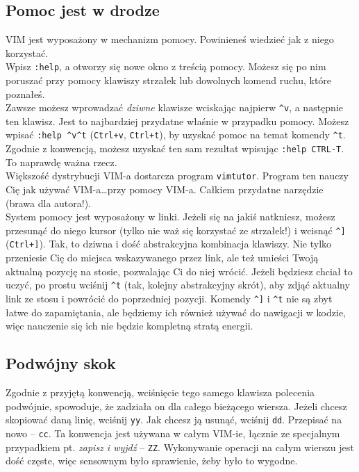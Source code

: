 \documentclass[a4paper,12pt]{article}
\begin{document}
\subsection{Pomoc jest w drodze}
VIM jest wyposażony w mechanizm pomocy. Powinieneś wiedzieć jak z niego korzystać.\\
Wpisz {\tt :help}, a otworzy się nowe okno z treścią pomocy. Możesz się po nim poruszać przy pomocy klawiszy strzałek lub dowolnych komend ruchu, które poznałeś.\\
Zawsze możesz wprowadzać {\it dziwne} klawisze wciskając najpierw {\tt \^{}v}, a następnie ten klawisz. Jest to najbardziej przydatne właśnie w przypadku pomocy. Możesz wpisać {\tt :help \^{}v\^{}t} ({\tt Ctrl+v}, {\tt Ctrl+t}), by uzyskać pomoc na temat komendy {\tt \^{}t}. Zgodnie z konwencją, możesz uzyskać ten sam rezultat wpisując {\tt :help CTRL-T}. To naprawdę ważna rzecz.\\
Większość dystrybucji VIM-a dostarcza program {\tt vimtutor}. Program ten nauczy Cię jak używać VIM-a\ldots przy pomocy VIM-a. Całkiem przydatne narzędzie (brawa dla autora!).\\
System pomocy jest wyposażony w linki. Jeżeli się na jakiś natkniesz, możesz przesunąć do niego kursor (tylko nie waż się korzystać ze strzałek!) i wcisnąć {\tt \^{}]} ({\tt Ctrl+]}). Tak, to dziwna i dość abstrakcyjna kombinacja klawiszy. Nie tylko przeniesie Cię do miejsca wskazywanego przez link, ale też umieści Twoją aktualną pozycję na stosie, pozwalając Ci do niej wrócić. Jeżeli będziesz chciał to uczyć, po prostu wciśnij {\tt \^{}t} (tak, kolejny abstrakcyjny skrót), aby zdjąć aktualny link ze stosu i powrócić do poprzedniej pozycji. Komendy {\tt \^{}]} i {\tt \^{}t} nie są zbyt łatwe do zapamiętania, ale będziemy ich również używać do nawigacji w kodzie, więc nauczenie się ich nie będzie kompletną stratą energii.
\subsection{Podwójny skok}
Zgodnie z przyjętą konwencją, wciśnięcie tego samego klawisza polecenia podwójnie, spowoduje, że zadziała on dla całego bieżącego wiersza. Jeżeli chcesz skopiować daną linię, wciśnij {\tt yy}. Jak chcesz ją usunąć, wciśnij {\tt dd}. Przepisać na nowo – {\tt cc}. Ta konwencja jest używana w całym VIM-ie, łącznie ze specjalnym przypadkiem pt. {\it zapisz i wyjdź} – {\tt ZZ}. Wykonywanie operacji na całym wierszu jest dość częste, więc sensownym było sprawienie, żeby było to wygodne.
\end{document}
